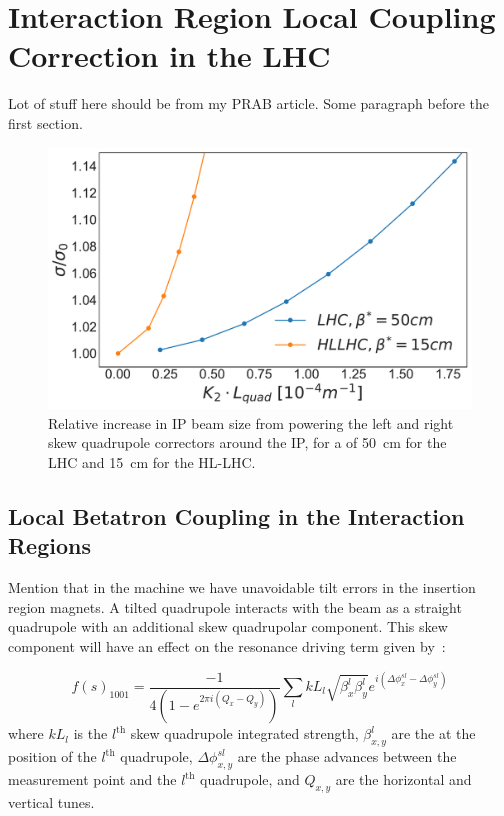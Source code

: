 \chapter{Interaction Region Local Coupling Correction in the LHC} %

\label{Chapter:IR_Local_Coupling} %

Lot of stuff here should be from my PRAB article.
Some paragraph before the first section.

\begin{figure}
    \centering
    \includegraphics*[width=0.9\linewidth]{Figures/Chapter4/lhc_vs_hllhc_ratios_normalised.pdf}
    \caption{Relative increase in IP beam size from powering the left and right skew quadrupole correctors around the IP, for a \betastar of \qty{50}{\centi\metre} for the LHC and \qty{15}{\centi\meter} for the HL-LHC.}
    \label{figure:lhc_vs_hllhc_ratios}
\end{figure}


\section{Local Betatron Coupling in the Interaction Regions}

Mention that in the machine we have unavoidable tilt errors in the insertion region magnets.
A tilted quadrupole interacts with the beam as a straight quadrupole with an additional skew quadrupolar component.
This skew component will have an effect on the \foneohone resonance driving term given by~\cite{PRAB:Calaga:MergingHamiltonianMatrixApproches}:

\begin{equation}
    f(s)_{1001} = \frac{-1}{4 \left(1 - e^{2 \pi i \left(Q_x - Q_y \right)}\right)} \sum_l k L_l \sqrt{\beta_x^l \beta_y^l} e^{i \left(\Delta \phi_x^{s l} - \Delta \phi_y^{s l}\right)}
    \label{eq:skew_quad_contribution_to_f1001}
\end{equation}
where \(k L_l\) is the \(l^{\mathrm{th}}\) skew quadrupole integrated strength, \(\beta^l_{x,y}\) are the \betafunctions at the position of the \(l^{\mathrm{th}}\) quadrupole, \(\Delta \phi^{sl}_{x,y}\) are the phase advances between the measurement point and the \(l^{\mathrm{th}}\) quadrupole, and \(Q_{x,y}\) are the horizontal and vertical tunes.

